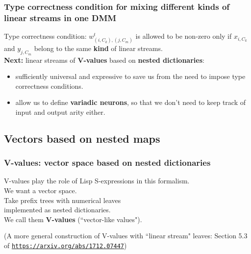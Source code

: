 \documentclass{beamer}
\newcommand{\msmagenta}[1]{{\color{mymagenta} #1}}
\begin{document}
\begin{frame}

  \frametitle{Type correctness condition  for mixing different kinds of linear streams in one DMM}


\msmagenta{Type correctness condition:} $w_{(i,C_k), (j,C_m)}^t$ is allowed to be
non-zero only if $x_{i,C_k}$ and $y_{j, C_m}$ belong to the same {\bf kind} of linear streams.\\[6ex]

{\bf Next:} \msmagenta{linear streams of {\bf V-values} based on {\bf nested dictionaries}:}\\[2ex]

\begin{itemize}

\item sufficiently universal and expressive to save us from the need to impose type correctness conditions.\\[2ex]

\item allow us to define {\bf variadic neurons}, so that we don't need to keep track of input and output
arity either.
\end{itemize}

\end{frame}








\subsection{Vectors based on nested maps}


\begin{frame}

  \frametitle{\msmagenta{V-values: vector space based on nested dictionaries}}


V-values play the role of Lisp S-expressions in this formalism.\\[3ex]


We want a vector space.\\[3ex]

Take prefix trees with numerical leaves\\ implemented as nested dictionaries.\\[3ex]

We call them {\bf V-values}
(``vector-like values").\\[3ex]

\hrulefill

(A more general construction of V-values with ``linear stream" leaves:  Section 5.3 of \href{https://arxiv.org/abs/1712.07447}{\tt\footnotesize  https://arxiv.org/abs/1712.07447})

\end{frame}
\end{document}
